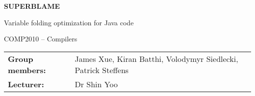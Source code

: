 \thispagestyle{empty}
\mbox{}
\vspace{1cm}
\begin{center}
\begin{Huge}
\textbf{SUPERBLAME}\\
\vspace{6mm}
\end{Huge}
{\Large Variable folding optimization for Java code}\\

\vspace{20mm}
\begin{Large}
COMP2010 -- Compilers
\end{Large}


\vspace{11cm}
\hspace{3cm}
\begin{tabular}{ll}
\centering
{\textbf{Group members:}} & James Xue, Kiran Batthi, Volodymyr Siedlecki, Patrick Steffens\\
{\textbf{Lecturer:}} & Dr Shin Yoo

\end{tabular}

\end{center}